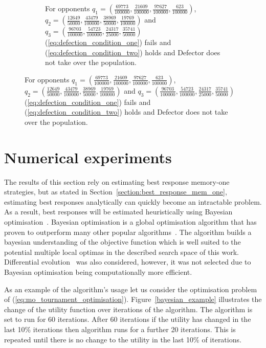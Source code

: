 \begin{figure}[!htb]
\begin{subfigure}{0.49\textwidth}
        \caption{For opponents $q_{1}=(\frac{69773}{100000},\frac{21609}{100000},\frac{97627}{100000},\frac{623}{100000})$,
        $q_{2}=(\frac{12649}{50000},\frac{43479}{100000},\frac{38969}{50000},\frac{19769}{100000})$ and
        $q_{3}=(\frac{96703}{100000},\frac{54723}{100000},\frac{24317}{25000},\frac{35741}{50000})$
        (\ref{eq:defection_condition_one}) fails and
        (\ref{eq:defection_condition_two}) holds and Defector does not take over
        the population.}
        \label{fig:unstable_defection}
    \end{subfigure}
\end{figure}

\section{Numerical experiments} \label{section:numerical_experiments}

The results of this section rely on estimating best response memory-one strategies, but as stated in
Section~\ref{section:best_response_mem_one}, estimating best responses
analytically can quickly become an intractable problem. As a result, best
responses will be estimated heuristically using Bayesian
optimisation~\cite{Mokus1978}. Bayesian optimisation is a global optimisation
algorithm that has proven to outperform many other popular
algorithms~\cite{Jones2001}. The algorithm builds a bayesian understanding of
the objective function which is well suited to the potential multiple local optimas in
the described search space of this work. Differential evolution~\cite{Storn1997}
was also considered, however, it was not selected due to Bayesian optimisation being
computationally more efficient.

As an example of the algorithm's usage let us consider the optimisation problem
of (\ref{eq:mo_tournament_optimisation}). Figure~\ref{bayesian_example}
illustrates the change of the utility function over iterations of the algorithm.
The algorithm is set to run for 60 iterations. After 60 iterations if the
utility has changed in the last 10\% iterations then algorithm runs for a
further 20 iterations. This is repeated until there is no change to the utility
in the last 10\% of iterations.


